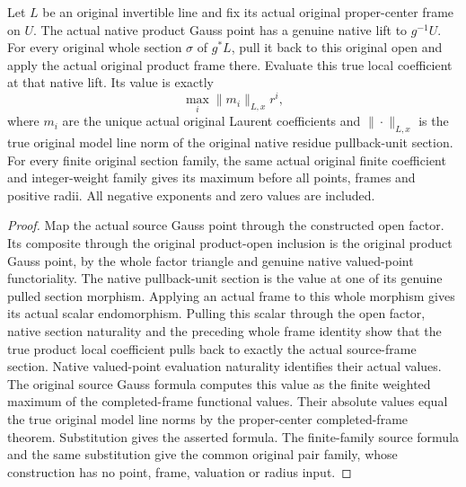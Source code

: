 \begin{theorem}\label{thm:fc-point-laurent-local-coefficient-value}
\leanok
{}
Let $L$ be an original invertible line and fix its actual original
proper-center frame on $U$. The actual native product Gauss point
has a genuine native lift to $g^{-1}U$. For every original whole
section $\sigma$ of $g^*L$, pull it back to this original open and
apply the actual original product frame there. Evaluate this true
local coefficient at that native lift. Its value is exactly
\[
 \max_i \|m_i\|_{L,x}r^i,
\]
where $m_i$ are the unique actual original Laurent coefficients
and $\|\cdot\|_{L,x}$ is the true original model line norm of the
original native residue pullback-unit section. For every finite
original section family, the same actual original finite coefficient
and integer-weight family gives its maximum before all points,
frames and positive radii. All negative exponents and zero values
are included.
\end{theorem}
\begin{proof}
Map the actual source Gauss point through the constructed open
factor. Its composite through the original product-open inclusion
is the original product Gauss point, by the whole factor triangle
and genuine native valued-point functoriality. The native
pullback-unit section is the value at one of its genuine pulled
section morphism. Applying an actual frame to this whole morphism
gives its actual scalar endomorphism. Pulling this scalar through
the open factor, native section naturality and the preceding whole
frame identity show that the true product local coefficient pulls
back to exactly the actual source-frame section. Native valued-point
evaluation naturality identifies their actual values. The original
source Gauss formula computes this value as the finite weighted
maximum of the completed-frame functional values. Their absolute
values equal the true original model line norms by the proper-center
completed-frame theorem. Substitution gives the asserted formula.
The finite-family source formula and the same substitution give
the common original pair family, whose construction has no point,
frame, valuation or radius input.
\end{proof}

